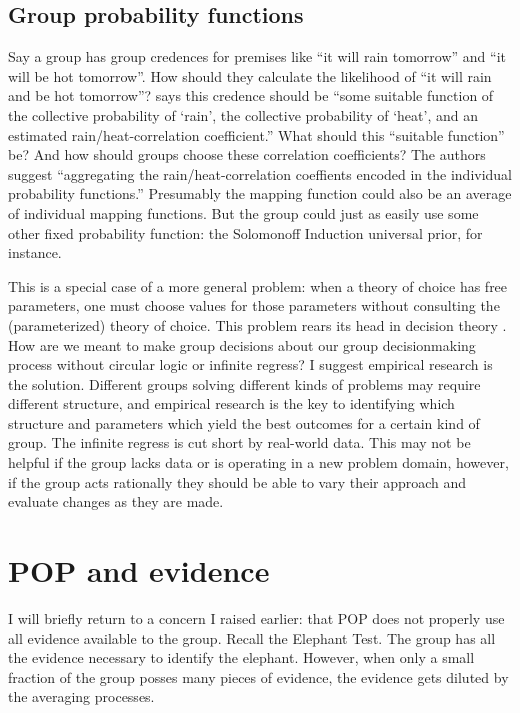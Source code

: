 \documentclass{article}
\begin{document}
\subsection{Group probability functions}

Say a group has group credences for premises like ``it will rain tomorrow'' and ``it will be hot tomorrow''. How should they calculate the likelihood of ``it will rain and be hot tomorrow''? \citet[pg. 3]{dietrich2013probabilistic} says this credence should be ``some suitable function of the collective probability of `rain', the collective probability of `heat', and an estimated rain/heat-correlation coefficient.'' What should this ``suitable function'' be? And how should groups choose these correlation coefficients? The authors suggest ``aggregating the rain/heat-correlation coeffients encoded in the individual probability functions.'' Presumably the mapping function could also be an average of individual mapping functions. But the group could just as easily use some other fixed probability function: the Solomonoff Induction universal prior, for instance.

This is a special case of a more general problem: when a theory of choice has free parameters, one must choose values for those parameters without consulting the (parameterized) theory of choice. This problem rears its head in decision theory \citep[pg 10-12]{resnik1987choices}. How are we meant to make group decisions about our group decisionmaking process without circular logic or infinite regress? I suggest empirical research is the solution. Different groups solving different kinds of problems may require different structure, and empirical research is the key to identifying which structure and parameters which yield the best outcomes for a certain kind of group. The infinite regress is cut short by real-world data. This may not be helpful if the group lacks data or is operating in a new problem domain, however, if the group acts rationally they should be able to vary their approach and evaluate changes as they are made.

\section{POP and evidence}

I will briefly return to a concern I raised earlier: that POP does not properly use all evidence available to the group. Recall the Elephant Test. The group has all the evidence necessary to identify the elephant. However, when only a small fraction of the group posses many pieces of evidence, the evidence gets diluted by the averaging processes.
\end{document}
